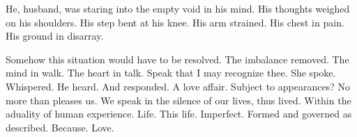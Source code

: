 

He, husband, was staring into the empty void in his mind.  His
thoughts weighed on his shoulders.  His step bent at his knee.  His
arm strained.  His chest in pain.  His ground in disarray.

Somehow this situation would have to be resolved.  The imbalance
removed.  The mind in walk.  The heart in talk.  Speak that I may
recognize thee.  She spoke.  Whispered.  He heard.  And responded.  A
love affair.  Subject to appearances?  No more than pleases us.  We
speak in the silence of our lives, thus lived.  Within the aduality of
human experience.  Life.  This life.  Imperfect.  Formed and governed
as described.  Because.  Love.

\bye
